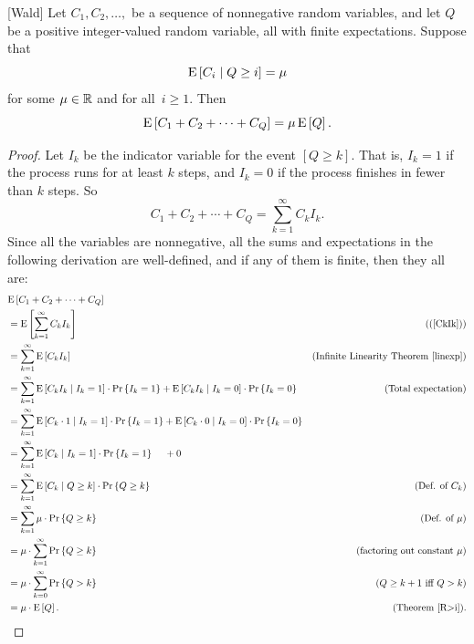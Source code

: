 \documentclass[11pt,twoside]{article}
\begin{document}
\begin{theorem} \label{wald} [Wald]
Let $C_1, C_2, \dots,$ be a sequence of nonnegative random variables, and
let $Q$ be a positive integer-valued random variable, all with finite
expectations.  Suppose that
\[
\mathop{\textup{E}}\nolimits\left[ C_i\mid Q \geq i\right] = \mu
\]
for some $\mu \in \mathbb{R}$ and for all~$i \geq 1$.  Then
\[
\mathop{\textup{E}}\nolimits\left[C_1 + C_2 + \cdots + C_Q\right] = \mu \mathop{\textup{E}}\nolimits\left[Q\right].
\]
\end{theorem}
\begin{proof}

Let $I_k$ be the indicator variable for the event $[Q \geq k]$.  That is,
$I_k = 1$ if the process runs for at least $k$ steps, and $I_k = 0$ if the
process finishes in fewer than $k$ steps.  So
\begin{equation}\label{CkIk}
    C_1 + C_2 + \cdots + C_Q = \sum_{k = 1}^\infty C_k I_k.
\end{equation}
Since all the variables are nonnegative, all the sums and expectations in
the following derivation are well-defined, and if any of them is finite,
then they all are:
\begin{align*}
\lefteqn{\expect{C_1 + C_2 + \cdots + C_Q}}\\
        &= \expect{\sum_{k = 1}^\infty C_k I_k}
                & \text{((\ref{CkIk}))}\\
        &= \sum_{k = 1}^\infty \expect{C_k I_k} 
                   &\text{(Infinite Linearity Theorem~\ref{linexp})}\\
        &= \sum_{k = 1}^\infty \expcond{C_k I_k}{I_k = 1} \cdot \prob{I_k = 1} +
                              \expcond{C_k I_k}{I_k = 0} \cdot \prob{I_k = 0}
            & \text{(Total expectation)}\\
        &= \sum_{k = 1}^\infty \expcond{C_k \cdot 1}{I_k = 1} \cdot \prob{I_k = 1}
                     + \expcond{C_k \cdot 0}{I_k = 0} \cdot \prob{I_k = 0}\\
        &= \sum_{k = 1}^\infty \expcond{C_k}{I_k = 1} \cdot \prob{I_k = 1} \quad\ + 0\\
        &= \sum_{k = 1}^\infty \expcond{C_k}{Q \geq k} \cdot \prob{Q \geq k} 
                & \text{(Def. of $C_k$)}\\
        &= \sum_{k = 1}^\infty \mu \cdot \prob{Q \geq k} 
                & \text{(Def. of $\mu$)}\\
        &= \mu \cdot \sum_{k = 1}^\infty \prob{Q \geq k}
                  & \text{(factoring out constant $\mu$)}\\
        &= \mu \cdot \sum_{k = 0}^\infty \prob{Q > k}
                  & \text{($Q\geq k+1$ iff $Q>k$)}\\
        &= \mu \cdot \expect{Q}.  & \text{(Theorem~\ref{R>i})}.
\end{align*}

\end{proof}
\end{document}
